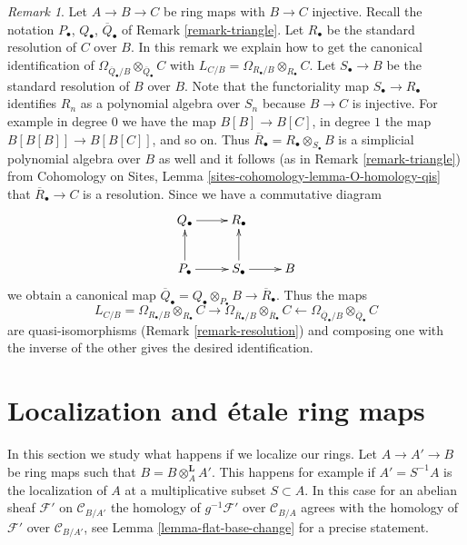 \documentclass{stacks-project}
\theoremstyle{plain}
\theoremstyle{definition}
\theoremstyle{remark}
\newtheorem{remark}[subsection]{Remark}
\numberwithin{equation}{subsection}
\begin{document}
\begin{remark}
\label{remark-explicit-map}
Let $A \to B \to C$ be ring maps with $B \to C$ injective.
Recall the notation $P_\bullet$, $Q_\bullet$, $\overline{Q}_\bullet$ of
Remark \ref{remark-triangle}.
Let $R_\bullet$ be the standard resolution of $C$ over $B$.
In this remark we explain how to get the canonical identification
of $\Omega_{\overline{Q}_\bullet/B} \otimes_{\overline{Q}_\bullet} C$
with $L_{C/B} = \Omega_{R_\bullet/B} \otimes_{R_\bullet} C$.
Let $S_\bullet \to B$ be the standard resolution of $B$ over $B$.
Note that the functoriality map $S_\bullet \to R_\bullet$ identifies
$R_n$ as a polynomial algebra over $S_n$ because $B \to C$ is injective.
For example in degree $0$ we have the map $B[B] \to B[C]$, in degree
$1$ the map $B[B[B]] \to B[B[C]]$, and so on. Thus
$\overline{R}_\bullet = R_\bullet \otimes_{S_\bullet} B$
is a simplicial polynomial algebra
over $B$ as well and it follows (as in Remark \ref{remark-triangle}) from
Cohomology on Sites, Lemma
\ref{sites-cohomology-lemma-O-homology-qis}
that $\overline{R}_\bullet \to C$ is a resolution. Since we have
a commutative diagram
$$
\xymatrix{
Q_\bullet \ar[r] & R_\bullet \\
P_\bullet \ar[u] \ar[r] & S_\bullet \ar[u] \ar[r] & B
}
$$
we obtain a canonical map
$\overline{Q}_\bullet = Q_\bullet \otimes_{P_\bullet} B \to
\overline{R}_\bullet$. Thus the maps
$$
L_{C/B} = \Omega_{R_\bullet/B} \otimes_{R_\bullet} C
\longrightarrow
\Omega_{\overline{R}_\bullet/B} \otimes_{\overline{R}_\bullet} C
\longleftarrow
\Omega_{\overline{Q}_\bullet/B} \otimes_{\overline{Q}_\bullet} C
$$
are quasi-isomorphisms (Remark \ref{remark-resolution}) and composing
one with the inverse of the other gives the desired identification.
\end{remark}





\section{Localization and \'etale ring maps}
\label{section-localization}

\noindent
In this section we study what happens if we localize our rings.
Let $A \to A' \to B$ be ring maps such that $B = B \otimes_A^\mathbf{L} A'$.
This happens for example if $A' = S^{-1}A$ is the localization of $A$
at a multiplicative subset $S \subset A$. In this
case for an abelian sheaf $\mathcal{F}'$ on $\mathcal{C}_{B/A'}$
the homology of $g^{-1}\mathcal{F}'$ over $\mathcal{C}_{B/A}$ agrees with
the homology of $\mathcal{F}'$ over $\mathcal{C}_{B/A'}$, see
Lemma \ref{lemma-flat-base-change} for a precise statement.
\end{document}
